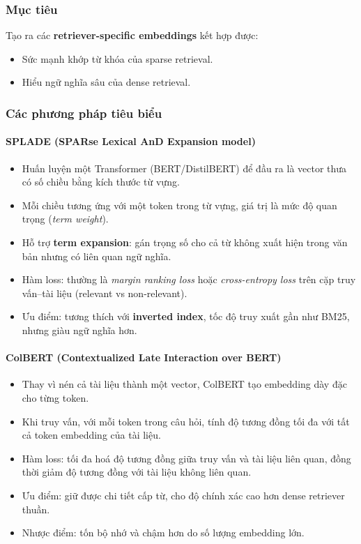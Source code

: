 \subsubsection*{Mục tiêu}
Tạo ra các \textbf{retriever-specific embeddings} kết hợp được:
\begin{itemize}
    \item Sức mạnh khớp từ khóa của sparse retrieval.
    \item Hiểu ngữ nghĩa sâu của dense retrieval.
\end{itemize}

\subsubsection*{Các phương pháp tiêu biểu}
\paragraph{SPLADE (SPARse Lexical AnD Expansion model)}
\begin{itemize}
    \item Huấn luyện một Transformer (BERT/DistilBERT) để đầu ra là vector thưa có số chiều bằng kích thước từ vựng.
    \item Mỗi chiều tương ứng với một token trong từ vựng, giá trị là mức độ quan trọng (\textit{term weight}).
    \item Hỗ trợ \textbf{term expansion}: gán trọng số cho cả từ không xuất hiện trong văn bản nhưng có liên quan ngữ nghĩa.
    \item Hàm loss: thường là \textit{margin ranking loss} hoặc \textit{cross-entropy loss} trên cặp truy vấn–tài liệu (relevant vs non-relevant).
    \item Ưu điểm: tương thích với \textbf{inverted index}, tốc độ truy xuất gần như BM25, nhưng giàu ngữ nghĩa hơn.
\end{itemize}

\paragraph{ColBERT (Contextualized Late Interaction over BERT)}
\begin{itemize}
    \item Thay vì nén cả tài liệu thành một vector, ColBERT tạo embedding dày đặc cho từng token.
    \item Khi truy vấn, với mỗi token trong câu hỏi, tính độ tương đồng tối đa với tất cả token embedding của tài liệu.
    \item Hàm loss: tối đa hoá độ tương đồng giữa truy vấn và tài liệu liên quan, đồng thời giảm độ tương đồng với tài liệu không liên quan.
    \item Ưu điểm: giữ được chi tiết cấp từ, cho độ chính xác cao hơn dense retriever thuần.
    \item Nhược điểm: tốn bộ nhớ và chậm hơn do số lượng embedding lớn.
\end{itemize}

